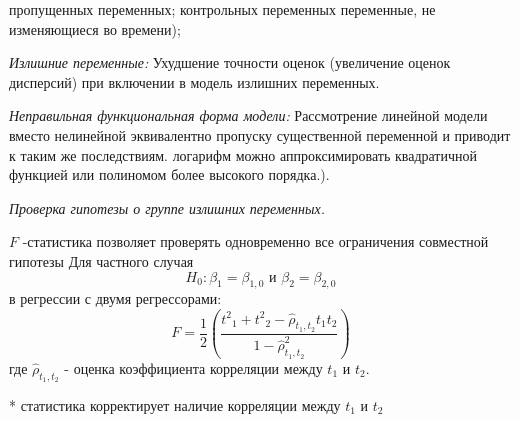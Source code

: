 \documentclass[a4paper,8pt]{article} %
\begin{document}
пропущенных переменных; 
контрольных
 переменных
%
%
% 
переменные, не изменяющиеся во времени);



\textit{Излишние  переменные: }
Ухудшение  точности  оценок (увеличение  оценок  дисперсий)  при  включении  в  модель  излишних  переменных.  


\textit{Неправильная  функциональная  форма  модели: }
Рассмотрение линейной модели вместо нелинейной эквивалентно
пропуску существенной переменной и приводит к таким же последствиям.  
 логарифм можно аппроксимировать квадратичной функцией или полиномом более высокого порядка.).

\textit{Проверка гипотезы  о  группе  излишних  переменных. }

$F$ -статистика позволяет проверять одновременно все ограничения совместной гипотезы
Для частного случая
$$
H_{0}: \beta_{1}=\beta_{1,0} \text { и } \beta_{2}=\beta_{2,0}
$$
в регрессии с двумя регрессорами:
$$
F=\frac{1}{2}\left(\frac{t^{2}{ }_{1}+t^{2}{ }_{2}-\widehat{\rho}_{t_{1}, t_{2}} t_{1} t_{2}}{1-\hat{\rho}_{t_{1}, t_{2}}^{2}}\right)
$$
где $\hat{\rho}_{t_{1}, t_{2}}$ - оценка коэффициента корреляции между $t_{1}$ и $t_{2} .$

* статистика корректирует наличие корреляции между $t_{1}$ и $t_{2}$
\end{document}
